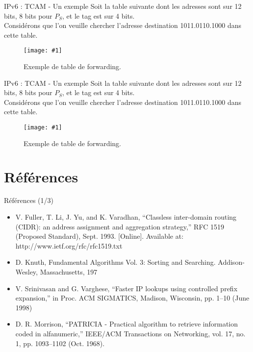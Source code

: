 \documentclass{beamer}
\newcommand{\imageR}[2]{\texttt{[image: \#1]}}
\begin{document}
\begin{frame}{IPv6 : TCAM - Un exemple}
Soit la table suivante dont les adresses sont sur 12 bits, 8 bits pour $P_S$, 
et le tag est sur 4 bits. \\
Considérons que l'on veuille chercher l'adresse destination 1011.0110.1000 dans cette table.
\begin{figure}
	\begin{center}
	\imageR{CN_010.png}{200}
	\caption{Exemple de table de forwarding.}
	\end{center}	
\end{figure}

\end{frame}

\begin{frame}{IPv6 : TCAM - Un exemple}
Soit la table suivante dont les adresses sont sur 12 bits, 8 bits pour $P_S$, 
et le tag est sur 4 bits. \\
Considérons que l'on veuille chercher l'adresse destination 1011.0110.1000 dans cette table.
\begin{figure}
	\begin{center}
	\imageR{CN_011.png}{200}
	\caption{Exemple de table de forwarding.}
	\end{center}	
\end{figure}

\end{frame}
\section{Références}
\begin{frame}{Références (1/3)}
\begin{itemize}

\item V. Fuller, T. Li, J. Yu, and K. Varadhan, “Classless inter-domain routing (CIDR): an address
assignment and aggregation strategy,” RFC 1519 (Proposed Standard), Sept. 1993. [Online].
Available at: http://www.ietf.org/rfc/rfc1519.txt
\item D. Knuth, Fundamental Algorithms Vol. 3: Sorting and Searching. Addison-Wesley,
Massachusetts, 197
\item V. Srinivasan and G. Varghese, “Faster IP lookups using controlled prefix expansion,” in Proc.
ACM SIGMATICS, Madison, Wisconsin, pp. 1–10 (June 1998)
\item D. R. Morrison, “PATRICIA - Practical algorithm to retrieve information coded in alfanumeric,”
IEEE/ACM Transactions on Networking, vol. 17, no. 1, pp. 1093–1102 (Oct. 1968).

\end{itemize}
\end{frame}
\end{document}
